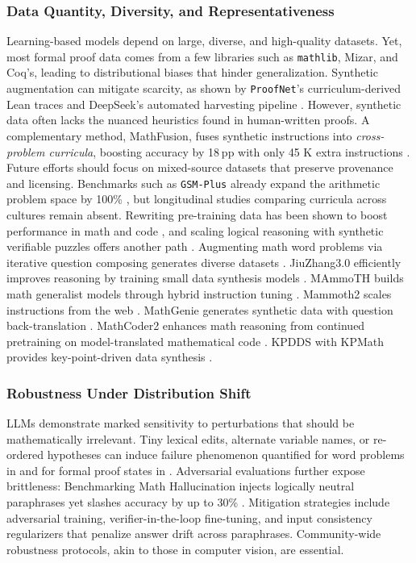 \documentclass[acmsmall,anonymous]{acmart}
\begin{document}
\subsubsection{Data Quantity, Diversity, and Representativeness}\label{sec:datafuture}
Learning-based models depend on large, diverse, and high-quality datasets.  Yet, most formal proof data comes from a few libraries such as \texttt{mathlib}, Mizar, and Coq’s, leading to distributional biases that hinder generalization.  Synthetic augmentation can mitigate scarcity, as shown by \texttt{ProofNet}’s curriculum-derived Lean traces \cite{azerbayev2023proofnet} and DeepSeek’s automated harvesting pipeline \cite{xin2024deepseek}. However, synthetic data often lacks the nuanced heuristics found in human-written proofs. A complementary method, MathFusion, fuses synthetic instructions into \emph{cross-problem curricula}, boosting accuracy by 18 pp with only 45 K extra instructions \cite{Pei2025MathFusion}.  Future efforts should focus on mixed-source datasets that preserve provenance and licensing.  Benchmarks such as \texttt{GSM-Plus} already expand the arithmetic problem space by 100\% \cite{li2024gsmplus}, but longitudinal studies comparing curricula across cultures remain absent. Rewriting pre-training data has been shown to boost performance in math and code \cite{anonymous2025rewritingpretraining}, and scaling logical reasoning with synthetic verifiable puzzles offers another path \cite{anonymous2025enigmata}. Augmenting math word problems via iterative question composing generates diverse datasets \cite{liu2023augmenting}. JiuZhang3.0 efficiently improves reasoning by training small data synthesis models \cite{zhou2024a}. MAmmoTH builds math generalist models through hybrid instruction tuning \cite{yue2023}. Mammoth2 scales instructions from the web \cite{yue2024c}. MathGenie generates synthetic data with question back-translation \cite{lu2024b}. MathCoder2 enhances math reasoning from continued pretraining on model-translated mathematical code \cite{lu2024c}. KPDDS with KPMath provides key-point-driven data synthesis \cite{huang2024c}.

\subsubsection{Robustness Under Distribution Shift}\label{sec:robustfuture}
LLMs demonstrate marked sensitivity to perturbations that should be mathematically irrelevant.  Tiny lexical edits, alternate variable names, or re-ordered hypotheses can induce failure phenomenon quantified for word problems in \cite{frieder2023mathematical} and for formal proof states in \cite{huang2023large}.  Adversarial evaluations further expose brittleness: Benchmarking Math Hallucination injects logically neutral paraphrases yet slashes accuracy by up to 30\% \cite{sun2024benchmarking}.  Mitigation strategies include adversarial training, verifier-in-the-loop fine-tuning, and input consistency regularizers that penalize answer drift across paraphrases.  Community-wide robustness protocols, akin to those in computer vision, are essential. 
\end{document}
